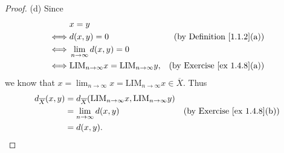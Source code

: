 \begin{proof}{(d)}
    Since
    \begin{align*}
             & x = y                                                                                               \\
        \iff & d(x, y) = 0                                                & \text{(by Definition \ref{1.1.2}(a))}  \\
        \iff & \lim_{n \to \infty} d(x, y) = 0                                                                     \\
        \iff & \text{LIM}_{n \to \infty} x = \text{LIM}_{n \to \infty} y, & \text{(by Exercise \ref{ex 1.4.8}(a))}
    \end{align*}
    we know that \(x = \lim_{n \to \infty} x = \text{LIM}_{n \to \infty} x \in \overline{X}\).
    Thus
    \begin{align*}
        d_{\overline{X}}(x, y) & = d_{\overline{X}}(\text{LIM}_{n \to \infty} x, \text{LIM}_{n \to \infty} y)                                          \\
                               & = \lim_{n \to \infty} d(x, y)                                                & \text{(by Exercise \ref{ex 1.4.8}(b))} \\
                               & = d(x, y).
    \end{align*}
\end{proof}

